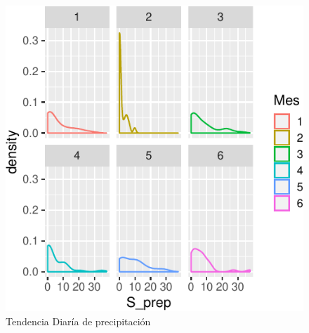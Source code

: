 \documentclass[letterpaper,9pt,twocolumn,twoside,]{pinp}
\begin{document}
\begin{figure}

{\centering \includegraphics{report_hidrolgy_files/figure-latex/unnamed-chunk-2-1} 

}

\caption{Tendencia Diaría de precipitación}\label{fig:unnamed-chunk-2}
\end{figure}
\end{document}
